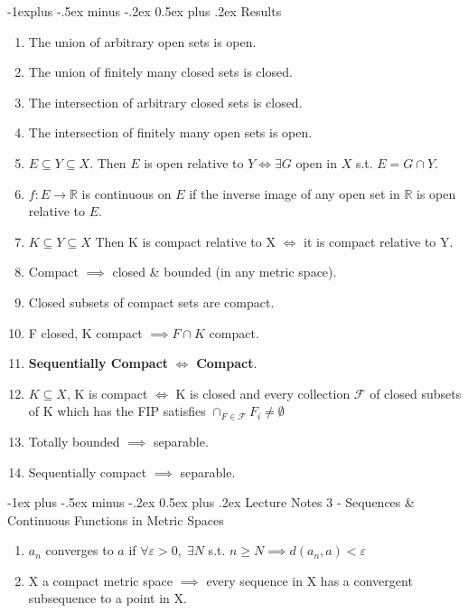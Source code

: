 \documentclass[10pt,landscape]{article}
\makeatletter
\renewcommand{\section}{\@startsection{section}{1}{0mm}%
                                {-1ex plus -.5ex minus -.2ex}%
                                {0.5ex plus .2ex}%
                                {\normalfont\large\bfseries}}
\renewcommand{\subsection}{\@startsection{subsection}{2}{0mm}%
                                {-1explus -.5ex minus -.2ex}%
                                {0.5ex plus .2ex}%
                                {\normalfont\normalsize\bfseries}}
\makeatother
\begin{document}
\begin{multicols}{3}
\begin{enumerate}
\end{enumerate}
\subsection{Results} 
\begin{enumerate}
	\item The union of arbitrary open sets is open.
	\item The union of finitely many closed sets is closed.
	\item The intersection of arbitrary closed sets is closed.
	\item The intersection of finitely many open sets is open.
	\item $E \subseteq Y \subseteq X$. Then $E$ is open relative to $Y \iff \exists G$ open in $X$ s.t. $E = G\cap Y$.
	\item $f:E \rightarrow \mathbb{R}$ is continuous on $E$ if the inverse image of any open set in $\mathbb{R}$ is open relative to $E$. 
	\item $K \subseteq Y \subseteq X$ Then K is compact relative to X $\iff$ it is compact  relative to Y.
	\item Compact $\implies$ closed \& bounded (in any metric space).
	\item Closed subsets of compact sets are compact.
	\item F closed, K compact $\implies F\cap K$ compact.
	\item \textbf{Sequentially Compact} $\iff$ \textbf{Compact}.
	\item $K \subseteq X$, K is compact $\iff$ K is closed and every collection $\mathcal{F}$ of closed subsets of K which has the FIP satisfies $\cap_{F\in\mathcal{F}}F_i \neq \emptyset$
	\item Totally bounded $\implies$ separable.  
	\item Sequentially compact $\implies$ separable.
\end{enumerate}

\section{Lecture Notes 3 - Sequences \& Continuous Functions in Metric Spaces}

\begin{enumerate}
	\item $a_n$ converges to $a$ if $\forall \varepsilon >0, \; \exists N$ s.t. $n\geq N \implies d(a_n, a) < \varepsilon$
	
	\item X a compact metric space $\implies$ every sequence in X has a convergent subsequence to a point in X.
	

\end{enumerate}
\end{multicols}
\end{document}
